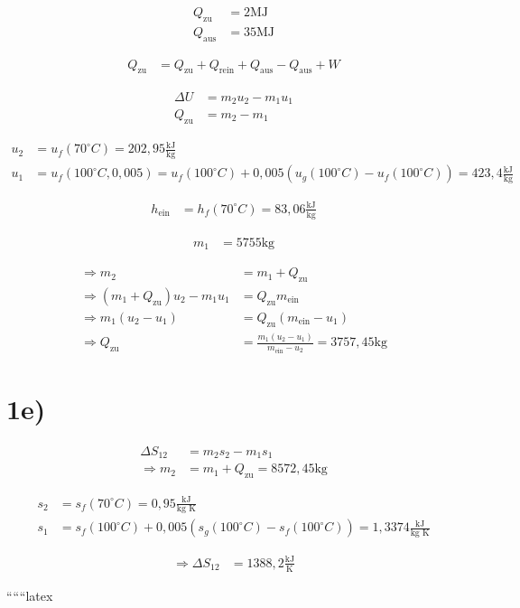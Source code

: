 \begin{align*}
Q_{\text{zu}} &= 2 \text{MJ} \\
Q_{\text{aus}} &= 35 \text{MJ}
\end{align*}

\begin{align*}
Q_{\text{zu}} &= Q_{\text{zu}} + Q_{\text{rein}} + Q_{\text{aus}} - Q_{\text{aus}} + W
\end{align*}

\begin{align*}
\Delta U &= m_2 u_2 - m_1 u_1 \\
Q_{\text{zu}} &= m_2 - m_1
\end{align*}

\begin{align*}
u_2 &= u_f(70^\circ C) = 202,95 \frac{\text{kJ}}{\text{kg}} \\
u_1 &= u_f(100^\circ C, 0,005) = u_f(100^\circ C) + 0,005 (u_g(100^\circ C) - u_f(100^\circ C)) = 423,4 \frac{\text{kJ}}{\text{kg}}
\end{align*}

\begin{align*}
h_{\text{ein}} &= h_f(70^\circ C) = 83,06 \frac{\text{kJ}}{\text{kg}}
\end{align*}

\begin{align*}
m_1 &= 5755 \text{kg}
\end{align*}

\begin{align*}
\Rightarrow m_2 &= m_1 + Q_{\text{zu}} \\
\Rightarrow (m_1 + Q_{\text{zu}}) u_2 - m_1 u_1 &= Q_{\text{zu}} m_{\text{ein}} \\
\Rightarrow m_1 (u_2 - u_1) &= Q_{\text{zu}} (m_{\text{ein}} - u_1) \\
\Rightarrow Q_{\text{zu}} &= \frac{m_1 (u_2 - u_1)}{m_{\text{ein}} - u_2} = 3757,45 \text{kg}
\end{align*}

\section*{1e)}

\begin{align*}
\Delta S_{12} &= m_2 s_2 - m_1 s_1 \\
\Rightarrow m_2 &= m_1 + Q_{\text{zu}} = 8572,45 \text{kg}
\end{align*}

\begin{align*}
s_2 &= s_f(70^\circ C) = 0,95 \frac{\text{kJ}}{\text{kg K}} \\
s_1 &= s_f(100^\circ C) + 0,005 (s_g(100^\circ C) - s_f(100^\circ C)) = 1,3374 \frac{\text{kJ}}{\text{kg K}}
\end{align*}

\begin{align*}
\Rightarrow \Delta S_{12} &= 1388,2 \frac{\text{kJ}}{\text{K}}
\end{align*}

``````latex


